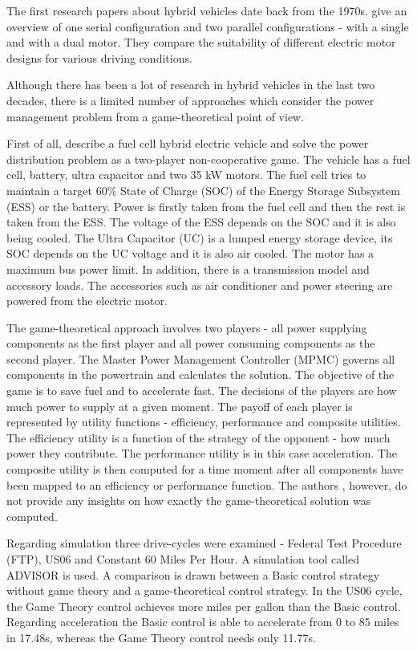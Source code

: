 The first research papers about hybrid vehicles date back from the 1970s. \citet{lafrance1973electrical} give an overview of one serial configuration and two parallel configurations - with a single and with a dual motor. They compare the suitability of different electric motor designs for various driving conditions.

Although there has been a lot of research in hybrid vehicles in the last two decades, there is a limited number of approaches which consider the power management problem from a game-theoretical point of view.


First of all, \citet{gielniak2004power} describe a fuel cell hybrid electric vehicle and solve the power distribution problem as a two-player non-cooperative game. The vehicle has a fuel cell, battery, ultra capacitor and two 35 kW motors. The fuel cell tries to maintain a target 60\% State of Charge (SOC) of the Energy Storage Subsystem (ESS) or the battery. Power is firstly taken from the fuel cell and then the rest is taken from the ESS. The voltage of the ESS depends on the SOC and it is also being cooled. The Ultra Capacitor (UC) is a lumped energy storage device, its SOC depends on the UC voltage and it is also air cooled. The motor has a maximum bus power limit. In addition, there is a transmission model and accessory loads. The accessories such as air conditioner and power steering are powered from the electric motor.

The game-theoretical approach involves two players - all power supplying components as the first player and all power consuming components as the second player. The Master Power Management Controller (MPMC) governs all components in the powertrain and calculates the solution. The objective of the game is to save fuel and to accelerate fast. The decisions of the players are how much power to supply at a given moment. The payoff of each player is represented by utility functions - efficiency, performance and composite utilities. The efficiency utility is a function of the strategy of the opponent - how much power they contribute. The performance utility is in this case acceleration. The composite utility is then computed for a time moment after all components have been mapped to an efficiency or performance function. The authors \citet{gielniak2004power}, however, do not provide any insights on how exactly the game-theoretical solution was computed.

Regarding simulation three drive-cycles were examined - Federal Test Procedure (FTP), US06 and Constant 60 Miles Per Hour. A simulation tool called ADVISOR \citep{burch1999advisor} is used. A comparison is drawn between a Basic control strategy without game theory and a game-theoretical control strategy. In the US06 cycle, the Game Theory control achieves more miles per gallon than the Basic control. Regarding acceleration the Basic control is able to accelerate from 0 to 85 miles in 17.48s, whereas the Game Theory control needs only 11.77s.

